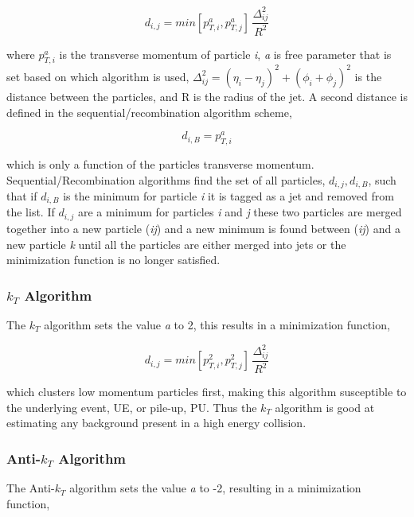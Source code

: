 \begin{equation}
d_{i,j} = min[p^{a}_{T,i},p^{a}_{T,j}] \, \frac{\Delta^{2}_{ij}}{R^{2}}
\label{eq:JetAlgo}
\end{equation}

\noindent
where $p^{a}_{T,i}$ is the transverse momentum of particle \textit{i}, \textit{a} is free parameter that is set based on which algorithm is used, $\Delta^{2}_{ij} = (\eta_{i} - \eta_{j})^{2} + (\phi_{i} + \phi_{j})^{2}$ is the distance between the particles, and R is the radius of the jet.  A second distance is defined in the sequential/recombination algorithm scheme,

\begin{equation}
d_{i,B} = p^{a}_{T,i}
\label{eq:MinJet}
\end{equation}

\noindent
which is only a function of the particles transverse momentum.  Sequential/Recombination algorithms find the set of all particles, ${d_{i,j},d_{i,B}}$, such that if $d_{i,B}$ is the minimum for particle \textit{i} it is tagged as a jet and removed from the list.  If $d_{i,j}$ are a minimum for particles \textit{i} and \textit{j} these two particles are merged together into a new particle (\textit{ij}) and a new minimum is found between (\textit{ij}) and a new particle \textit{k} until all the particles are either merged into jets or the minimization function is no longer satisfied.

\subsubsection{$k_{T}$ Algorithm}
The $k_{T}$ algorithm sets the value \textit{a} to 2, this results in a minimization function,

\begin{equation}
d_{i,j} = min[p^{2}_{T,i},p^{2}_{T,j}] \, \frac{\Delta^{2}_{ij}}{R^{2}}
\label{eq:kt}
\end{equation}

\noindent
which clusters low momentum particles first, making this algorithm susceptible to the underlying event, UE, or pile-up, PU.  Thus the $k_{T}$ algorithm is good at estimating any background present in a high energy collision. 

\subsubsection{Anti-$k_{T}$ Algorithm}
The Anti-$k_{T}$ algorithm sets the value \textit{a} to -2, resulting in a minimization function,


